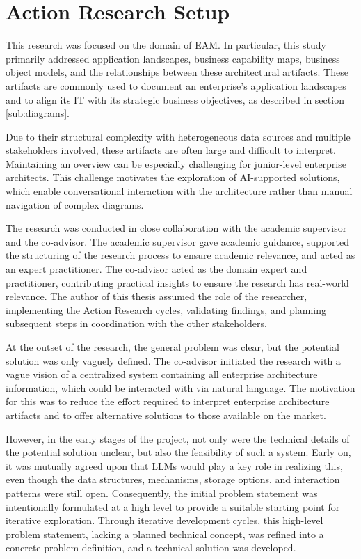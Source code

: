\section{Action Research Setup}
\label{sec:action_research_setup}

This research was focused on the domain of EAM. In particular, this study primarily addressed application landscapes, business capability maps, business object models, and the relationships between these architectural artifacts. These artifacts are commonly used to document an enterprise's application landscapes and to align its IT with its strategic business objectives, as described in section \ref{sub:diagrams}. %

Due to their structural complexity with heterogeneous data sources and multiple stakeholders involved, these artifacts are often large and difficult to interpret. Maintaining an overview can be especially challenging for junior-level enterprise architects. This challenge motivates the exploration of AI-supported solutions, which enable conversational interaction with the architecture rather than manual navigation of complex diagrams.

The research was conducted in close collaboration with the academic supervisor and the co-advisor. The academic supervisor gave academic guidance, supported the structuring of the research process to ensure academic relevance, and acted as an expert practitioner. The co-advisor acted as the domain expert and practitioner, contributing practical insights to ensure the research has real-world relevance. The author of this thesis assumed the role of the researcher, implementing the Action Research cycles, validating findings, and planning subsequent steps in coordination with the other stakeholders.

At the outset of the research, the general problem was clear, but the potential solution was only vaguely defined. The co-advisor initiated the research with a vague vision of a centralized system containing all enterprise architecture information, which could be interacted with via natural language. The motivation for this was to reduce the effort required to interpret enterprise architecture artifacts and to offer alternative solutions to those available on the market.

However, in the early stages of the project, not only were the technical details of the potential solution unclear, but also the feasibility of such a system. Early on, it was mutually agreed upon that LLMs would play a key role in realizing this, even though the data structures, mechanisms, storage options, and interaction patterns were still open. Consequently, the initial problem statement was intentionally formulated at a high level to provide a suitable starting point for iterative exploration. Through iterative development cycles, this high-level problem statement, lacking a planned technical concept, was refined into a concrete problem definition, and a technical solution was developed.


